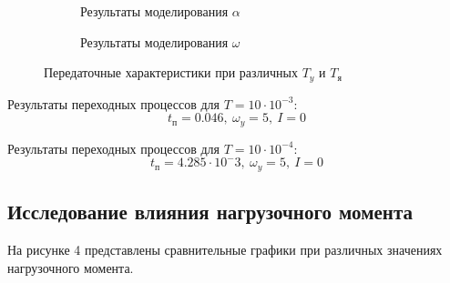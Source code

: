 \documentclass[a4paper, 11pt]{article}
\begin{document}
\begin{figure}[h!]
\begin{subfigure}{0.5\textwidth}
		\caption{Результаты моделирования $\alpha$}
    \end{subfigure}
    \begin{subfigure}{0.5\textwidth}
	\centering
		\caption{Результаты моделирования $\omega$}
    \end{subfigure}
    \caption{Передаточные характеристики при различных $T_y$ и $T_\text{я}$}
\end{figure}

\par 
Результаты переходных процессов для $T = 10\cdot10^{-3}$:
\begin{equation*}
	t_\text{п} = 0.046,\ \omega_y = 5,\ I = 0
\end{equation*}
\par 
Результаты переходных процессов для $T = 10\cdot10^{-4}$:
\begin{equation*}
	t_\text{п} = 4.285\cdot10^-{3},\ \omega_y = 5,\ I = 0
\end{equation*}

\newpage
\begin{center}
	\section{Исследование влияния нагрузочного момента}
\end{center}
\par 
На рисунке 4 представлены сравнительные графики при различных значениях нагрузочного момента.
\end{document}
